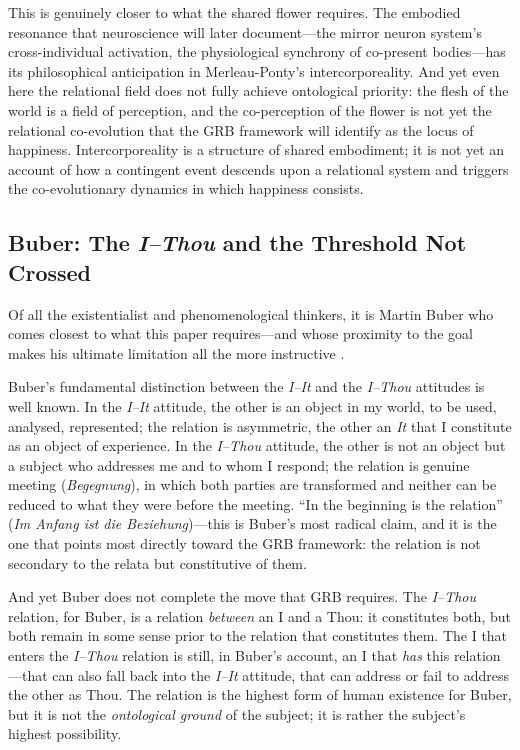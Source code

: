This is genuinely closer to what the shared flower requires. The embodied resonance that neuroscience will later document---the mirror neuron system's cross-individual activation, the physiological synchrony of co-present bodies---has its philosophical anticipation in Merleau-Ponty's intercorporeality. And yet even here the relational field does not fully achieve ontological priority: the flesh of the world is a field of perception, and the co-perception of the flower is not yet the relational co-evolution that the GRB framework will identify as the locus of happiness. Intercorporeality is a structure of shared embodiment; it is not yet an account of how a contingent event descends upon a relational system and triggers the co-evolutionary dynamics in which happiness consists.

\subsection{Buber: The \emph{I--Thou} and the Threshold Not Crossed}
\label{p14:subsec:buber}

\noindent
Of all the existentialist and phenomenological thinkers, it is Martin Buber who comes closest to what this paper requires---and whose proximity to the goal makes his ultimate limitation all the more instructive \parencite{buber1970}.

Buber's fundamental distinction between the \emph{I--It} and the \emph{I--Thou} attitudes is well known. In the \emph{I--It} attitude, the other is an object in my world, to be used, analysed, represented; the relation is asymmetric, the other an \emph{It} that I constitute as an object of experience. In the \emph{I--Thou} attitude, the other is not an object but a subject who addresses me and to whom I respond; the relation is genuine meeting (\emph{Begegnung}), in which both parties are transformed and neither can be reduced to what they were before the meeting. ``In the beginning is the relation'' (\emph{Im Anfang ist die Beziehung})---this is Buber's most radical claim, and it is the one that points most directly toward the GRB framework: the relation is not secondary to the relata but constitutive of them.

And yet Buber does not complete the move that GRB requires. The \emph{I--Thou} relation, for Buber, is a relation \emph{between} an I and a Thou: it constitutes both, but both remain in some sense prior to the relation that constitutes them. The I that enters the \emph{I--Thou} relation is still, in Buber's account, an I that \emph{has} this relation---that can also fall back into the \emph{I--It} attitude, that can address or fail to address the other as Thou. The relation is the highest form of human existence for Buber, but it is not the \emph{ontological ground} of the subject; it is rather the subject's highest possibility.

